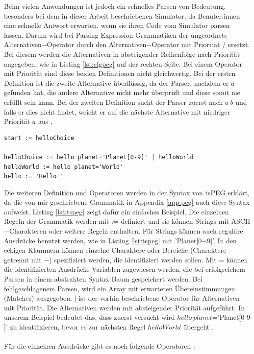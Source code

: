 \documentclass[a4paper, 11pt, onecolumn]{article}
\begin{document}
Beim vielen Anwendungen ist jedoch ein schnelles Parsen von Bedeutung, besonders bei dem in dieser Arbeit beschriebenen Simulator, da Benuter:innen eine schnelle Antwort erwarten, wenn sie ihren Code vom Simulator parsen lassen. Darum wird bei Parsing Expression Grammatiken der ungeordnete Alternativen$-$Operator durch den Alternativen$-$Operator mit Priorität / ersetzt. Bei diesem werden die Alternativen in absteigender Reihenfolge nach Priorität angegeben, wie in Listing \ref{lst:cfgpeg} auf der rechten Seite. Bei einem Operator mit Priorität sind diese beiden Definitionen nicht gleichwertig. Bei der ersten Definition ist die zweite Alternative überflüssig, da der Parser, nachdem er $a$ gefunden hat, die andere Alternative nicht mehr überprüft und diese somit nie erfüllt sein kann. Bei der zweiten Definition sucht der Parser zuerst nach $a~b$ und falls er dies nicht findet, weicht er auf die nächste Alternative mit niedriger Priorität $a$ aus \cite{peg}.\\

\begin{lstlisting}[basicstyle=\ttfamily\footnotesize, backgroundcolor=\color{backcolour}, caption={Angepasstes Hello World Beispiel für tsPEG \cite{tspeg}},captionpos=b, label={lst:tspeg}]
start := helloChoice

helloChoice := hello planet='Planet[0-9]' | helloWorld
helloWorld := hello planet='World'
hello := 'Hello '
\end{lstlisting}

Die weiteren Definition und Operatoren werden in der Syntax von tsPEG erklärt, da die von mir geschriebene Grammatik in Appendix \ref{app:peg} auch diese Syntax aufweist. Listing \ref{lst:tspeg} zeigt dafür ein einfaches Beispiel. Die einzelnen Regeln der Grammatik werden mit := definiert und sie können Strings mit ASCII$-$Charakteren oder weitere Regeln enthalten. Für Strings können auch reguläre Ausdrücke benutzt werden, wie in Listing \ref{lst:tspeg} mit 'Planet$[$0$-$9$]$'. In den eckigen Klammern können einzelne Charaktere oder Bereiche (Charaktere getrennt mit $-$) spezifiziert werden, die identifiziert werden sollen. Mit = können die identifizierten Ausdrücke Variablen zugewiesen werden, die bei erfolgreichem Parsen in einem abstrakten Syntax Baum gespeichert werden. Bei fehlgeschlagenem Parsen, wird ein Array mit erwarteten Übereinstimmungen (Matches) ausgegeben. $\mid$ ist der vorhin beschriebene Operator für Alternativen mit Priorität. Die Alternativen werden mit absteigender Priorität aufgeführt. In unserem Beispiel bedeutet das, dass zuerst versucht wird $hello~planet$='Planet$[$0-9$]$' zu identifizieren, bevor es zur nächsten Regel $helloWorld$ übergeht \cite{tspeg}.\\ \\
Für die einzelnen Ausdrücke gibt es noch folgende Operatoren \cite{tspeg}:
\end{document}
